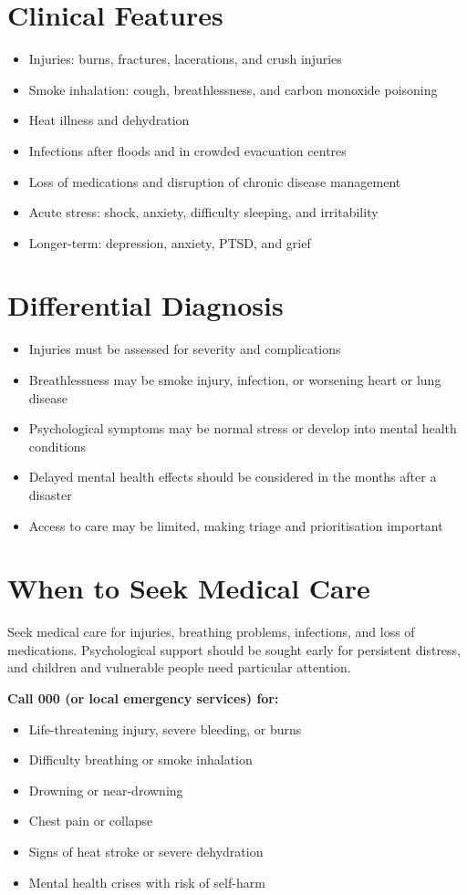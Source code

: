 \section*{Clinical Features}
\begin{itemize}
    \item Injuries: burns, fractures, lacerations, and crush injuries
    \item Smoke inhalation: cough, breathlessness, and carbon monoxide poisoning
    \item Heat illness and dehydration
    \item Infections after floods and in crowded evacuation centres
    \item Loss of medications and disruption of chronic disease management
    \item Acute stress: shock, anxiety, difficulty sleeping, and irritability
    \item Longer-term: depression, anxiety, PTSD, and grief
\end{itemize}

\section*{Differential Diagnosis}
\begin{itemize}
    \item Injuries must be assessed for severity and complications
    \item Breathlessness may be smoke injury, infection, or worsening heart or lung disease
    \item Psychological symptoms may be normal stress or develop into mental health conditions
    \item Delayed mental health effects should be considered in the months after a disaster
    \item Access to care may be limited, making triage and prioritisation important
\end{itemize}

\section*{When to Seek Medical Care}
Seek medical care for injuries, breathing problems, infections, and loss of medications. Psychological support should be sought early for persistent distress, and children and vulnerable people need particular attention.

\textbf{Call 000 (or local emergency services) for:}
\begin{itemize}
    \item Life-threatening injury, severe bleeding, or burns
    \item Difficulty breathing or smoke inhalation
    \item Drowning or near-drowning
    \item Chest pain or collapse
    \item Signs of heat stroke or severe dehydration
    \item Mental health crises with risk of self-harm
\end{itemize}

